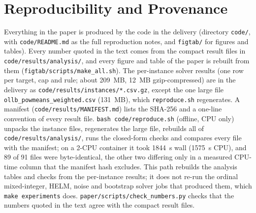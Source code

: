 \section{Reproducibility and Provenance}
\label{app:repro}

Everything in the paper is produced by the code in the delivery (directory \texttt{code/}, with \texttt{code/README.md} as the full reproduction notes, and \texttt{figtab/} for figures and tables). Every number quoted in the text comes from the compact result files in \texttt{code/results/analysis/}, and every figure and table of the paper is rebuilt from them (\texttt{figtab/scripts/make\_all.sh}). The per-instance solver results (one row per target, cap and rule; about 209~MB, 12~MB gzip-compressed) are in the delivery as \texttt{code/results/instances/*.csv.gz}, except the one large file \texttt{ollb\_powmeans\_weighted.csv} (131~MB), which \texttt{reproduce.sh} regenerates. A manifest (\texttt{code/results/MANIFEST.md}) lists the SHA-256 and a one-line convention of every result file. \texttt{bash code/reproduce.sh} (offline, CPU only) unpacks the instance files, regenerates the large file, rebuilds all of \texttt{code/results/analysis/}, runs the closed-form checks and compares every file with the manifest; on a 2-CPU container it took 1844~s wall (1575~s CPU), and 89 of 91 files were byte-identical, the other two differing only in a measured CPU-time column that the manifest hash excludes. This path rebuilds the analysis tables and checks from the per-instance results; it does not re-run the ordinal mixed-integer, HELM, noise and bootstrap solver jobs that produced them, which \texttt{make experiments} does. \texttt{paper/scripts/check\_numbers.py} checks that the numbers quoted in the text agree with the compact result files.

